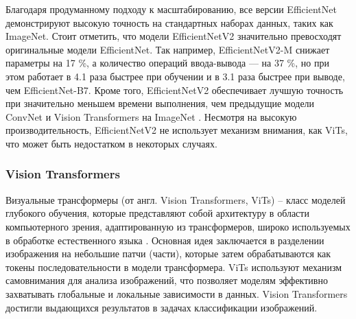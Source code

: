 \documentclass[a4paper,12pt]{extarticle}
\begin{document}
Благодаря продуманному подходу к масштабированию, все версии EfficientNet демонстрируют высокую точность на стандартных наборах данных, таких как ImageNet. Стоит отметить, что модели EfficientNetV2 значительно превосходят оригинальные модели EfficientNet. Так например, EfficientNetV2-M снижает параметры на 17 \%, а количество операций ввода-вывода — на 37 
\%, но при этом работает в 4.1 раза быстрее при обучении и в 3.1 раза быстрее при выводе, чем EfficientNet-B7. Кроме того, EfficientNetV2 обеспечивает лучшую точность при значительно меньшем времени выполнения, чем предыдущие модели ConvNet и Vision Transformers на ImageNet \cite{efficientnetv2}. Несмотря на высокую производительность, EfficientNetV2 не использует механизм внимания, как ViTs, что может быть недостатком в некоторых случаях. 

\subsubsection{Vision Transformers}

Визуальные трансформеры (от англ. Vision Transformers, ViTs) – класс моделей глубокого обучения, которые представляют собой архитектуру в области компьютерного зрения, адаптированную из трансформеров, широко используемых в обработке естественного языка \cite{vit}. Основная идея заключается в разделении изображения на небольшие патчи (части), которые затем обрабатываются как токены последовательности в модели трансформера. ViTs используют механизм самовнимания для анализа изображений, что позволяет моделям эффективно захватывать глобальные и локальные зависимости в данных. Vision Transformers достигли выдающихся результатов в задачах классификации изображений.
\end{document}
